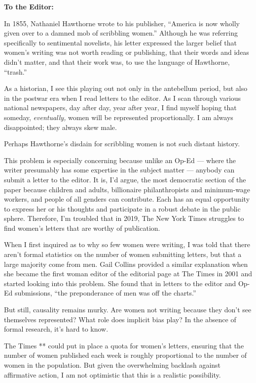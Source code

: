 \textbf{To the Editor:}

In 1855, Nathaniel Hawthorne wrote to his publisher, ``America is now
wholly given over to a damned mob of scribbling women.'' Although he was
referring specifically to sentimental novelists, his letter expressed
the larger belief that women's writing was not worth reading or
publishing, that their words and ideas didn't matter, and that their
work was, to use the language of Hawthorne, ``trash.''

As a historian, I see this playing out not only in the antebellum
period, but also in the postwar era when I read letters to the editor.
As I scan through various national newspapers, day after day, year after
year, I find myself hoping that someday, \emph{eventually,} women will
be represented proportionally. I am always disappointed; they always
skew male.

Perhaps Hawthorne's disdain for scribbling women is not such distant
history.

This problem is especially concerning because unlike an Op-Ed --- where
the writer presumably has some expertise in the subject matter ---
anybody can submit a letter to the editor. It is, I'd argue, the most
democratic section of the paper because children and adults, billionaire
philanthropists and minimum-wage workers, and people of all genders can
contribute. Each has an equal opportunity to express her or his thoughts
and participate in a robust debate in the public sphere. Therefore, I'm
troubled that in 2019, The New York Times struggles to find women's
letters that are worthy of publication.

When I first inquired as to why so few women were writing, I was told
that there aren't formal statistics on the number of women submitting
letters, but that a large majority come from men. Gail Collins provided
a similar explanation when she became the first woman editor of the
editorial page at The Times in 2001 and started looking into this
problem. She found that in letters to the editor and Op-Ed submissions,
``the preponderance of men was off the charts.''

But still, causality remains murky. Are women not writing because they
don't see themselves represented? What role does implicit bias play? In
the absence of formal research, it's hard to know.

The Times ** could put in place a quota for women's letters, ensuring
that the number of women published each week is roughly proportional to
the number of women in the population. But given the overwhelming
backlash against affirmative action, I am not optimistic that this is a
realistic possibility.


